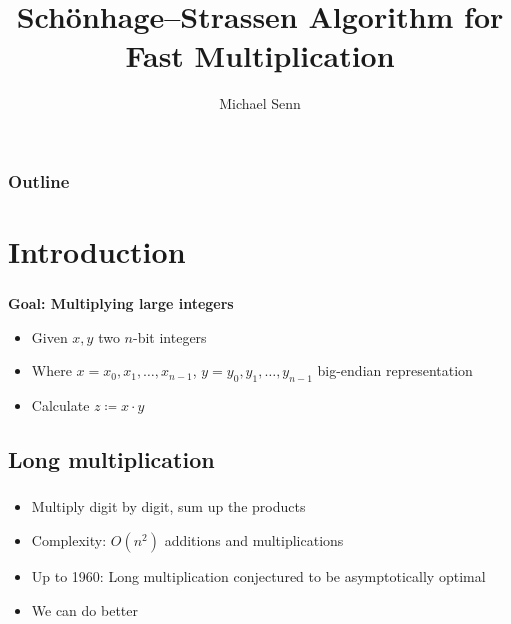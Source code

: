 \documentclass{beamer}
\title{Schönhage–Strassen Algorithm for Fast Multiplication}
\author{Michael Senn}
\institute{Faculty of Science, University of Bern}
\date{\DTMusedate{presentation}}
\begin{document}
\begin{frame}
		\titlepage

\end{frame}

\setcounter{tocdepth}{1}
\begin{frame}
		\frametitle{Outline}
		\frametitle{\secname}
		\framesubtitle{\subsecname}
		\tableofcontents
\end{frame}

\section{Introduction}

\begin{frame}
		\frametitle{\secname}

		\textbf{Goal: Multiplying large integers}

		\begin{itemize}
				\item Given $x, y$ two $n$-bit integers
				\item Where $x = x_0, x_1, \ldots, x_{n-1}$, $y = y_0, y_1, \ldots, y_{n-1}$ big-endian representation
				\item Calculate $z \coloneqq x \cdot y$
		\end{itemize}
\end{frame}

\subsection{Long multiplication}

\begin{frame}
		\frametitle{\secname}
		\framesubtitle{\subsecname}

		\begin{itemize}
				\item Multiply digit by digit, sum up the products
				\item Complexity: $O(n^2)$ additions and multiplications
				\item Up to 1960: Long multiplication conjectured to be asymptotically optimal
				\item We can do better
		\end{itemize}
\end{frame}
\end{document}
